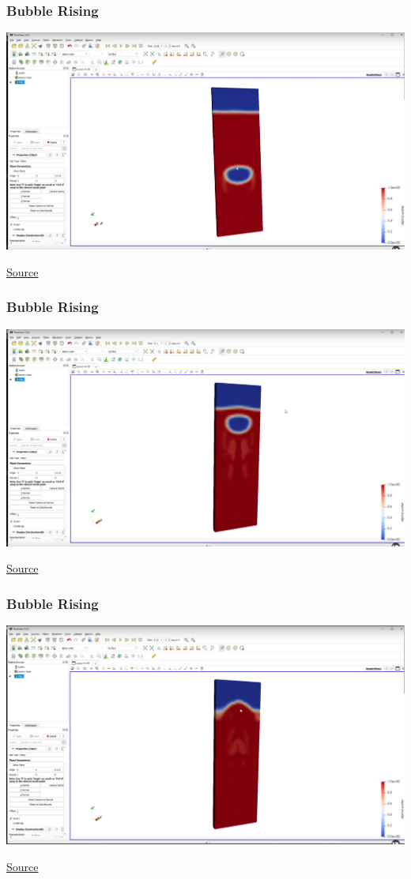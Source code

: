\documentclass{beamer}
\begin{document}
\begin{frame}
    \frametitle{Bubble Rising}
    \begin{center}
        \includegraphics[width=0.8\columnwidth]{bubble-rising-2}
    \end{center}
    \href{www.youtube.com/watch?v=JYHhF25OTm0}{Source}
\end{frame}

\begin{frame}
    \frametitle{Bubble Rising}
    \begin{center}
        \includegraphics[width=0.8\columnwidth]{bubble-rising-3}
    \end{center}
    \href{www.youtube.com/watch?v=JYHhF25OTm0}{Source}
\end{frame}

\begin{frame}
    \frametitle{Bubble Rising}
    \begin{center}
        \includegraphics[width=0.8\columnwidth]{bubble-rising-4}
    \end{center}
    \href{www.youtube.com/watch?v=JYHhF25OTm0}{Source}
\end{frame}
\end{document}

